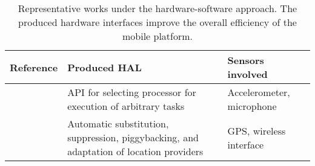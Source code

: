\begin{table}
    \centering
    \scriptsize{}
    \begin{tabular}{C{0.2\columnwidth}C{0.4\columnwidth}C{0.25\columnwidth}}
    \toprule
    \textbf{Reference} & \textbf{Produced HAL} & \textbf{Sensors involved} \\
    \midrule
    \cite{Ra2012} & API for selecting processor for execution of arbitrary tasks & Accelerometer, microphone \\
    
    \cite{Zhuang2010} & Automatic substitution, suppression, piggybacking, and adaptation of location providers & GPS, wireless interface \\
    
    \bottomrule
    \end{tabular}
    \protect\caption{Representative works under the hardware-software approach. The produced hardware interfaces improve the overall efficiency of the mobile platform.\label{tab:works-hardware-software-approach}}
\end{table}
